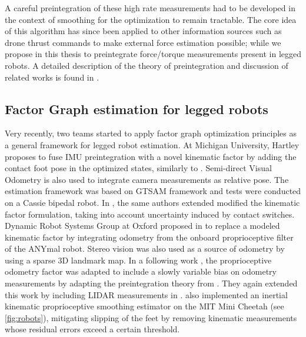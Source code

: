 A careful preintegration \cite{lupton-09,forster2017-TRO} of these high 
rate measurements had to be developed in the context of smoothing for the optimization to remain tractable. The core idea of this algorithm has 
since been applied to other information sources such as drone thrust commands \cite{nisar2019vimo} to make external force estimation possible; 
while we propose in this thesis to preintegrate force/torque measurements present in legged robots.
A detailed description of the theory of preintegration and discussion of related works is found in .


\subsection{Factor Graph estimation for legged robots}
Very recently, two teams started to apply factor graph optimization principles as a general framework for legged robot estimation. At Michigan University, Hartley \cite{hartley2018legged} 
proposes to fuse IMU preintegration with a novel kinematic factor by adding the contact foot pose in the optimized states, similarly to \cite{bloesch2013state,rotella2014state}. 
Semi-direct Visual Odometry \cite{forster2014svo} is also used to integrate camera measurements as relative pose. The estimation framework was based on GTSAM framework \cite{dellaert2012factor}
and tests were conducted on a Cassie bipedal robot. In \cite{hartley2018hybrid}, the same authors extended 
modified the kinematic factor formulation, taking into account uncertainty induced by contact switches. Dynamic Robot Systems Group at Oxford proposed in 
\cite{wisth2019robust} to replace a modeled kinematic factor by integrating odometry from the onboard proprioceptive filter of the ANYmal robot. Stereo vision was 
also used as a source of odometry by using a sparse 3D landmark map. In a following work \cite{wisth2020preintegrated}, the proprioceptive odometry factor was adapted
to include a slowly variable bias on odometry measurements by adapting the preintegration theory from \cite{forster2017-TRO}. They again extended this work
by including LIDAR measurements in \cite{wisth2021vilens}.
\cite{kim2021legged} also implemented an inertial kinematic proprioceptive smoothing estimator on the MIT Mini Cheetah (see \ref{fig:robots}), mitigating slipping of the feet by removing kinematic 
measurements whose residual errors exceed a certain threshold.    


